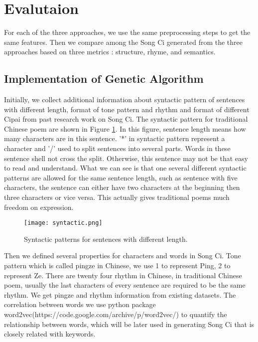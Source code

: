 \section{Evalutaion}
For each of the three approaches, we use the same preprocessing steps to get the same features. Then we compare among the  Song Ci generated from the three approaches based on three metrics : structure, rhyme, and semantics. 

 

\subsection{Implementation of Genetic Algorithm}
Initially, we collect additional information about syntactic pattern of sentences with different length, format of tone pattern and rhythm and format of different Cipai from past research work on Song Ci.
%
The syntactic pattern for traditional Chinese poem are shown in Figure \ref{fig:syntactic}.
%
In this figure, sentence length means how many characters are in this sentence.
%
'*' in syntactic pattern represent a character and '/' used to split sentences into several parts.
%
Words in these sentence shell not cross the split.
%
Otherwise, this sentence may not be that easy to read and understand.
%
What we can see is that one several different syntactic patterns are allowed for the same sentence length, such as sentence with five characters, the sentence can either have two characters at the beginning then three characters or vice versa.
%
This actually gives traditional poems much freedom on expression.

\begin{figure}[htbp]
	\centering
	\texttt{[image: syntactic.png]}
	\caption{Syntactic patterns for sentences with different length.}
	\label{fig:syntactic}
\end{figure}

Then we defined several properties for characters and words in Song Ci.
%
Tone pattern which is called pingze in Chinese, we use 1 to represent Ping, 2 to represent Ze.
%
There are twenty four rhythm in Chinese, in traditional Chinese poem, usually the last characters of every sentence are required to be the same rhythm.
%
 We get pingze and rhythm information from existing datasets.
%
The correlation between words we use python package word2vec(https://code.google.com/archive/p/word2vec/) to quantify the relationship between words, which will be later used in generating Song Ci that is closely related with keywords.


